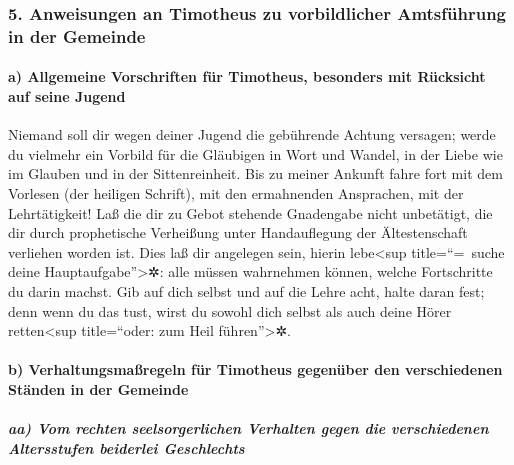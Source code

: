 \hypertarget{anweisungen-an-timotheus-zu-vorbildlicher-amtsfuxfchrung-in-der-gemeinde}{%
\subsubsection{5. Anweisungen an Timotheus zu vorbildlicher Amtsführung
in der
Gemeinde}\label{anweisungen-an-timotheus-zu-vorbildlicher-amtsfuxfchrung-in-der-gemeinde}}

\hypertarget{a-allgemeine-vorschriften-fuxfcr-timotheus-besonders-mit-ruxfccksicht-auf-seine-jugend}{%
\paragraph{a) Allgemeine Vorschriften für Timotheus, besonders mit
Rücksicht auf seine
Jugend}\label{a-allgemeine-vorschriften-fuxfcr-timotheus-besonders-mit-ruxfccksicht-auf-seine-jugend}}

 Niemand soll dir wegen deiner Jugend die gebührende
Achtung versagen; werde du vielmehr ein Vorbild für die Gläubigen in
Wort und Wandel, in der Liebe wie im Glauben und in der Sittenreinheit.
 Bis zu meiner Ankunft fahre fort mit dem Vorlesen (der
heiligen Schrift), mit den ermahnenden Ansprachen, mit der
Lehrtätigkeit!  Laß die dir zu Gebot stehende Gnadengabe
nicht unbetätigt, die dir durch prophetische Verheißung unter
Handauflegung der Ältestenschaft verliehen worden ist. 
Dies laß dir angelegen sein, hierin lebe\textless sup title=``=~suche
deine Hauptaufgabe''\textgreater✲: alle müssen wahrnehmen können, welche
Fortschritte du darin machst.  Gib auf dich selbst und
auf die Lehre acht, halte daran fest; denn wenn du das tust, wirst du
sowohl dich selbst als auch deine Hörer retten\textless sup
title=``oder: zum Heil führen''\textgreater✲.

\hypertarget{b-verhaltungsmauxdfregeln-fuxfcr-timotheus-gegenuxfcber-den-verschiedenen-stuxe4nden-in-der-gemeinde}{%
\paragraph{b) Verhaltungsmaßregeln für Timotheus gegenüber den
verschiedenen Ständen in der
Gemeinde}\label{b-verhaltungsmauxdfregeln-fuxfcr-timotheus-gegenuxfcber-den-verschiedenen-stuxe4nden-in-der-gemeinde}}

\hypertarget{aa-vom-rechten-seelsorgerlichen-verhalten-gegen-die-verschiedenen-altersstufen-beiderlei-geschlechts}{%
\subparagraph{aa) Vom rechten seelsorgerlichen Verhalten gegen die
verschiedenen Altersstufen beiderlei
Geschlechts}\label{aa-vom-rechten-seelsorgerlichen-verhalten-gegen-die-verschiedenen-altersstufen-beiderlei-geschlechts}}

